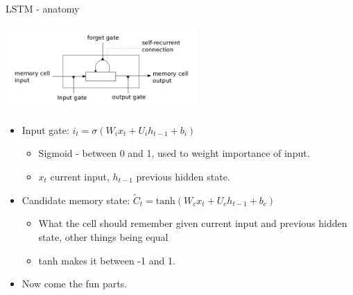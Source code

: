 \documentclass[xcolor=pdftex,x11names,table,hyperref]{beamer}
\begin{document}
\begin{frame}{LSTM - anatomy}
  \begin{center}
    \includegraphics[width=0.55\textwidth]{images/lstm_memorycell.png}
  \end{center}
  
  \begin{itemize}
  \item Input gate: $i_t = \sigma(W_i x_t + U_i h_{t-1} + b_i) $
    \begin{itemize}
    \item Sigmoid - between 0 and 1, used to weight importance of input. 
    \item $x_t$ current input, $h_{t-1}$ previous hidden state.      
    \end{itemize}\pause
  \item Candidate memory state: $ \tilde{C}_t = \text{tanh}( W_c x_t + U_c h_{t-1} + b_c ) $
    \begin{itemize}
    \item What the cell should remember given current input and previous hidden state, other things being equal
    \item tanh makes it between -1 and 1.
    \end{itemize}\pause
  \item Now come the fun parts.
  \end{itemize}
\end{frame}
  
\end{document}
